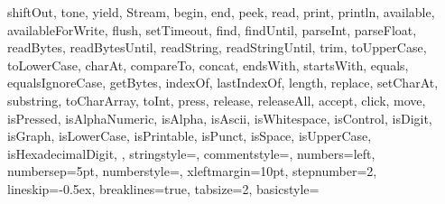 {{		shiftOut, tone, yield, Stream, begin, end, peek, read, print, 
		println, available, availableForWrite, flush, setTimeout, find, 
		findUntil, parseInt, parseFloat, readBytes, readBytesUntil, readString, 
		readStringUntil, trim, toUpperCase, toLowerCase, charAt, compareTo, 
		concat, endsWith, startsWith, equals, equalsIgnoreCase, getBytes, 
		indexOf, lastIndexOf, length, replace, setCharAt, substring, 
		toCharArray, toInt, press, release, releaseAll, accept, click, move, 
		isPressed, isAlphaNumeric, isAlpha, isAscii, isWhitespace, isControl, 
		isDigit, isGraph, isLowerCase, isPrintable, isPunct, isSpace, 
		isUpperCase, isHexadecimalDigit, 
	},      
	stringstyle=\color{arduinoDarkBlue},    
	commentstyle=\color{arduinoGrey},    
	numbers=left,                    
	numbersep=5pt,                   
	numberstyle=\color{arduinoGrey}\scriptsize,    
	xleftmargin=10pt,
	stepnumber=2,           
	lineskip=-0.5ex,           %
	breaklines=true,                    %
	tabsize=2,         
	basicstyle=\footnotesize\ttfamily
}